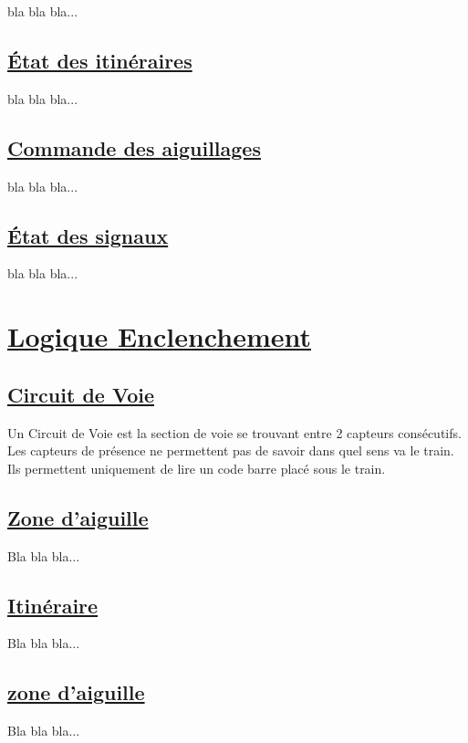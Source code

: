 bla bla bla...

\subsection{\underline{\'Etat des itinéraires}}
\label{sec:st_iti}

bla bla bla...


\subsection{\underline{Commande des aiguillages}}
\label{sec:cmd_aig}

bla bla bla...

\subsection{\underline{\'Etat des signaux}}
\label{sec:st_sig}

bla bla bla...
  







\newpage
\section{\underline{Logique Enclenchement}}
\label{sec:log_enc}

\subsection{\underline{Circuit de Voie}}
\label{sec:CdV}

Un Circuit de Voie est la section de voie se trouvant entre 2 capteurs
consécutifs. Les capteurs de présence ne permettent pas de savoir dans
quel sens va le train. Ils permettent uniquement de lire un code barre
placé sous le train.  

\subsection{\underline{Zone d'aiguille}}
\label{sec:aig}

Bla bla bla...


\subsection{\underline{Itinéraire}}
\label{sec:iti}

Bla bla bla...

\subsection{\underline{zone d'aiguille}}
\label{sec:aig}

Bla bla bla...



\newpage





